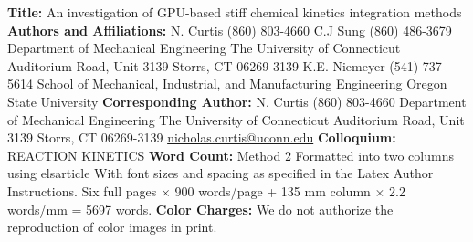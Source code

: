 \documentclass[final,twocolumn]{elsarticle}
\begin{document}
\begin{titlepage}
\parbox{\linewidth}{
\begin{flushleft}
\textbf{Title:}\linebreak
An investigation of GPU-based stiff chemical kinetics integration methods
\linebreak
\linebreak
\textbf{Authors and Affiliations:} \linebreak\linebreak
  N.  Curtis	(860) 803-4660 \linebreak
  C.J Sung	(860) 486-3679 \linebreak
  Department of Mechanical Engineering \linebreak
  The University of Connecticut  Auditorium Road, Unit 3139 \linebreak
  Storrs, CT 06269-3139 \linebreak
  \linebreak
  K.E. Niemeyer	(541) 737-5614 \linebreak
  School of Mechanical, Industrial, and Manufacturing Engineering\linebreak
  Oregon State University\linebreak
\linebreak
\textbf{Corresponding Author:}\linebreak
  N. Curtis\linebreak
  (860) 803-4660 \linebreak
  Department of Mechanical Engineering\linebreak
  The University of Connecticut  Auditorium Road, Unit 3139 \linebreak
  Storrs, CT 06269-3139 \linebreak
  \href{mailto:nicholas.curtis@uconn.edu}{nicholas.curtis@uconn.edu}\linebreak
\linebreak
\textbf{Colloquium:}\linebreak
REACTION KINETICS\linebreak
\linebreak
\textbf{Word Count:}\linebreak
Method 2\linebreak
Formatted into two columns using elsarticle\linebreak
With font sizes and spacing as specified in the Latex Author Instructions.\linebreak
Six full pages $\times$ 900 words/page + 135 mm column $\times$ 2.2 words/mm = 5697 words.\linebreak
\textbf{Color Charges:}\linebreak
We do not authorize the reproduction of color images in print.
\end{flushleft}
}
\end{titlepage}
\end{document}
